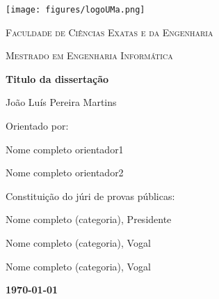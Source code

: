 \begin{titlepage}
    \centering
    \addtolength{\hoffset}{0.5cm}
        \centering
        \texttt{[image: figures/logoUMa.png]}\par\vspace{0.5cm}
        {\scshape\LARGE {} Faculdade de Ciências Exatas e da Engenharia \par}
        \vspace{1cm}
        {\scshape\Large Mestrado em Engenharia Informática \par}
        \vspace{1.5cm}
        {\huge\bfseries Titulo da dissertação \par}
        \vspace{2cm}
        {\Large João Luís Pereira Martins\par}
        \vfill
        {\large Orientado por: \par}
            Nome completo orientador1 \par
            Nome completo orientador2 \par
        \vfill
        {\large Constituição do júri de provas públicas: \par}
            Nome completo (categoria), Presidente \par
            Nome completo (categoria), Vogal \par
            Nome completo (categoria), Vogal \par
        \vfill
        {\large \bfseries \today \par}
    \end{titlepage}
